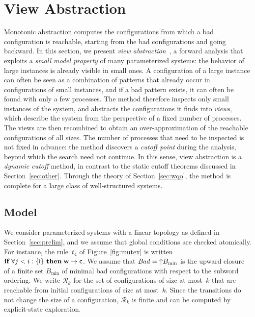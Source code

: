 \section{View Abstraction}
\label{sec:views}

Monotonic abstraction computes the configurations from which a bad
configuration is reachable, starting from the bad configurations and going
backward. In this section, we present \emph{view
abstraction}~\cite{AHH13,AHH16}, a forward analysis that exploits a
\emph{small model property} of many parameterized systems: the behavior of
large instances is already visible in small ones. A configuration of a large
instance can often be seen as a combination of patterns that already occur in
configurations of small instances, and if a bad pattern exists, it can often be
found with only a few processes. The method therefore inspects only small
instances of the system, and abstracts the configurations it finds into
\emph{views}, which describe the system from the perspective of a fixed number
of processes. The views are then recombined to obtain an over-approximation of
the reachable configurations of all sizes. The number of processes that need to
be inspected is not fixed in advance: the method discovers a \emph{cutoff
point} during the analysis, beyond which the search need not continue. In this
sense, view abstraction is a \emph{dynamic cutoff} method, in contrast to the
static cutoff theorems discussed in Section~\ref{sec:other}. Through the theory
of Section~\ref{sec:wqo}, the method is complete for a large class of
well-structured systems.

\subsection{Model}

We consider parameterized systems with a linear topology as defined in
Section~\ref{sec:prelim}, and we assume that global conditions are checked
atomically. For instance, the rule~$t_4$ of Figure~\ref{fig:mutex} is written
$\textbf{if}\ \forall j < i : \{\Idle\}\ \textbf{then}\ \Wait \to \Crit$. We assume that $\mathit{Bad} = {\uparrow}B_{\min}$ is the
upward closure of a finite set $B_{\min}$ of minimal bad configurations with
respect to the subword ordering. We write $\mathcal{R}_k$ for the set of configurations of size
at most~$k$ that are reachable from initial configurations of size at
most~$k$. Since the transitions do not change the size of a configuration,
$\mathcal{R}_k$ is finite and can be computed by explicit-state exploration.

